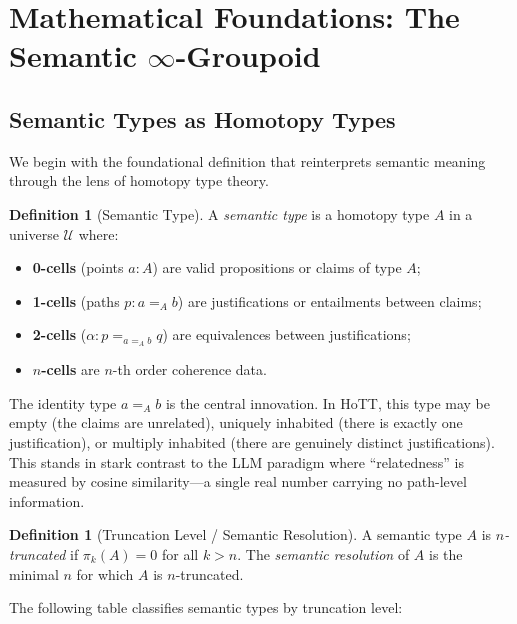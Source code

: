 \documentclass[11pt,a4paper]{article}
\theoremstyle{plain}
\theoremstyle{definition}
\newtheorem{definition}[theorem]{Definition}
\theoremstyle{remark}
\newcommand{\Type}{\mathcal{U}}
\begin{document}
\section{Mathematical Foundations: The Semantic $\infty$-Groupoid}
\label{sec:foundations}

\subsection{Semantic Types as Homotopy Types}

We begin with the foundational definition that reinterprets semantic meaning through the lens of homotopy type theory.

\begin{definition}[Semantic Type]
\label{def:semtype}
A \emph{semantic type} is a homotopy type $A$ in a universe $\Type$ where:
\begin{itemize}[nosep]
  \item \textbf{0-cells} (points $a : A$) are valid propositions or claims of type $A$;
  \item \textbf{1-cells} (paths $p : a =_A b$) are justifications or entailments between claims;
  \item \textbf{2-cells} ($\alpha : p =_{a =_A b} q$) are equivalences between justifications;
  \item \textbf{$n$-cells} are $n$-th order coherence data.
\end{itemize}
\end{definition}

The identity type $a =_A b$ is the central innovation. In HoTT, this type may be empty (the claims are unrelated), uniquely inhabited (there is exactly one justification), or multiply inhabited (there are genuinely distinct justifications). This stands in stark contrast to the LLM paradigm where ``relatedness'' is measured by cosine similarity---a single real number carrying no path-level information.

\begin{definition}[Truncation Level / Semantic Resolution]
\label{def:truncation}
A semantic type $A$ is \emph{$n$-truncated} if $\pi_k(A) = 0$ for all $k > n$. The \emph{semantic resolution} of $A$ is the minimal $n$ for which $A$ is $n$-truncated.
\end{definition}

The following table classifies semantic types by truncation level:
\end{document}

